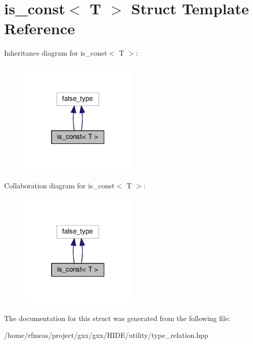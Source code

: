\hypertarget{structis__const}{}\section{is\+\_\+const$<$ T $>$ Struct Template Reference}
\label{structis__const}


Inheritance diagram for is\+\_\+const$<$ T $>$\+:
\nopagebreak
\begin{figure}[H]
\begin{center}
\leavevmode
\includegraphics[width=157pt]{structis__const__inherit__graph}
\end{center}
\end{figure}


Collaboration diagram for is\+\_\+const$<$ T $>$\+:
\nopagebreak
\begin{figure}[H]
\begin{center}
\leavevmode
\includegraphics[width=157pt]{structis__const__coll__graph}
\end{center}
\end{figure}


The documentation for this struct was generated from the following file\+:\begin{DoxyCompactItemize}
\item 
/home/rfmeas/project/gxx/gxx/\+H\+I\+D\+E/utility/type\+\_\+relation.\+hpp\end{DoxyCompactItemize}
